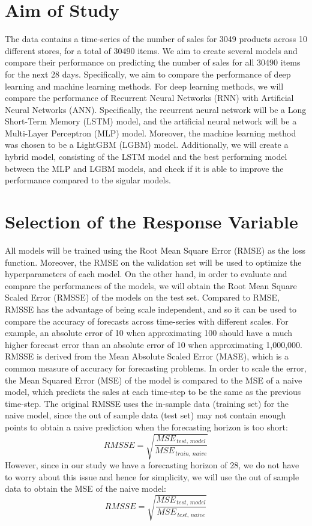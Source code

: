 \section{Aim of Study}
The data contains a time-series of the number of sales for 3049 products across 10 different stores, for a total of 30490 items. 
We aim to create several models and compare their performance on predicting the number of sales for all 30490 items for the next 28 days. 
Specifically, we aim to compare the performance of deep learning and machine learning methods.
For deep learning methods, we will compare the performance of Recurrent Neural Networks (RNN) with Artificial Neural Networks (ANN). 
Specifically, the recurrent neural network will be a Long Short-Term Memory (LSTM) model, and the artificial neural network will be a Multi-Layer Perceptron (MLP) model.
Moreover, the machine learning method was chosen to be a LightGBM (LGBM) model. 
Additionally, we will create a hybrid model, consisting of the LSTM model and the best performing model between the MLP and LGBM models, and check if it is able to improve the performance compared to the sigular models.


\section{Selection of the Response Variable}
All models will be trained using the Root Mean Square Error (RMSE) as the loss function.
Moreover, the RMSE on the validation set will be used to optimize the hyperparameters of each model.
On the other hand, in order to evaluate and compare the performances of the models, we will obtain the Root Mean Square Scaled Error (RMSSE) of the models on the test set.
Compared to RMSE, RMSSE has the advantage of being scale independent, and so it can be used to compare the accuracy of forecasts across time-series with different scales.
For example, an absolute error of 10 when approximating 100 should have a much higher forecast error than an absolute error of 10 when approximating 1,000,000.
RMSSE is derived from the Mean Absolute Scaled Error (MASE), which is a common measure of accuracy for forecasting problems.
In order to scale the error, the Mean Squared Error (MSE) of the model is compared to the MSE of a naive model, which predicts the sales at each time-step to be the same as the previous time-step.
The original RMSSE uses the in-sample data (training set) for the naive model, since the out of sample data (test set) may not contain enough points to obtain a naive prediction when the forecasting horizon is too short: \cite{yardstick, m5}
\[RMSSE = \sqrt{\frac{MSE_{\,test, \,model}}{MSE_{\,train, \,naive}}}\]
However, since in our study we have a forecasting horizon of 28, we do not have to worry about this issue and hence for simplicity, we will use the out of sample data to obtain the MSE of the naive model:
\[RMSSE = \sqrt{\frac{MSE_{\,test, \,model}}{MSE_{\,test, \,naive}}}\]


